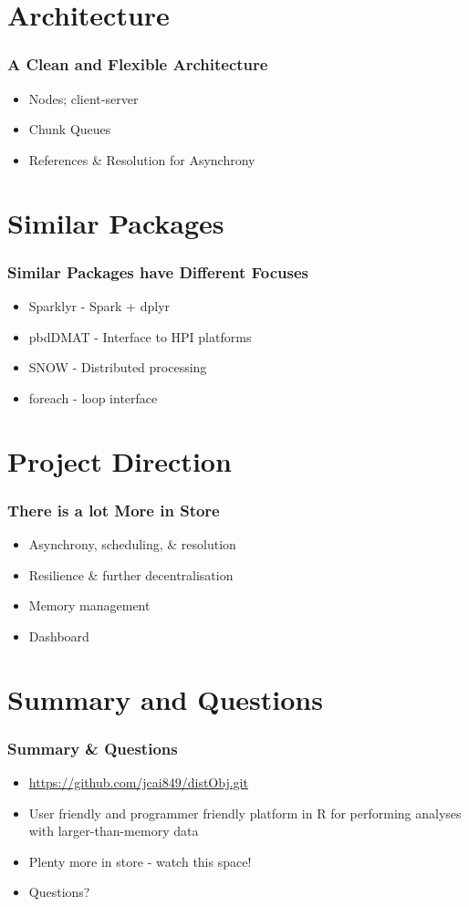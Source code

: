 \documentclass[handout]{beamer}
\begin{document}
\section{Architecture}
	\begin{frame}
		\frametitle{A Clean and Flexible Architecture}
		\begin{itemize}
			\item Nodes; client-server
			\item Chunk Queues
			\item References \& Resolution for Asynchrony
		\end{itemize}
	\end{frame}
\section{Similar Packages}
	\begin{frame}
		\frametitle{Similar Packages have Different Focuses}
		\begin{itemize}
			\item Sparklyr - Spark + dplyr
			\item pbdDMAT - Interface to HPI platforms
			\item SNOW - Distributed processing
			\item foreach - loop interface
		\end{itemize}
	\end{frame}
\section{Project Direction}
	\begin{frame}
		\frametitle{There is a lot More in Store}
		\begin{itemize}
			\item Asynchrony, scheduling, \& resolution
			\item Resilience \& further decentralisation
			\item Memory management
			\item Dashboard
		\end{itemize}
	\end{frame}
\section{Summary and Questions}
	\begin{frame}
		\frametitle{Summary \& Questions}
		\begin{itemize}
			\item \url{https://github.com/jcai849/distObj.git}
			\item User friendly and programmer friendly platform in
				R for performing analyses with
				larger-than-memory data
			\item Plenty more in store - watch this space!
			\item Questions?
		\end{itemize}
	\end{frame}
\end{document}
